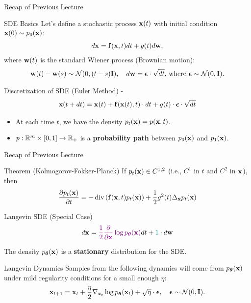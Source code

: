 \documentclass{beamer}
\begin{document}
\begin{frame}{Recap of Previous Lecture}
	\vspace{-0.2cm}
	\begin{block}{SDE Basics}
		Let's define a stochastic process $\mathbf{x}(t)$ with initial condition $\mathbf{x}(0) \sim p_0(\mathbf{x})$:
		\[
			d\mathbf{x} = \mathbf{f}(\mathbf{x}, t) dt + g(t) d \mathbf{w}, 
		\]
		where $\mathbf{w}(t)$ is the standard Wiener process (Brownian motion):
		\vspace{-0.2cm}
		\[		
			\mathbf{w}(t) - \mathbf{w}(s) \sim \mathcal{N}(0, (t - s) \mathbf{I}), \quad d \mathbf{w} = \boldsymbol{\epsilon} \cdot \sqrt{dt}, \, \text{where } \boldsymbol{\epsilon} \sim \mathcal{N}(0, \mathbf{I}).
		\]
	\end{block}
	\vspace{-0.3cm}
	\begin{block}{Discretization of SDE (Euler Method) - \SDESolve}
		\vspace{-0.3cm}
		\[
			\mathbf{x}(t + dt) = \mathbf{x}(t) + \mathbf{f}(\mathbf{x}(t), t) \cdot dt + g(t) \cdot \boldsymbol{\epsilon} \cdot \sqrt{dt}
		\]
		\vspace{-0.3cm}
	\end{block}
	\begin{itemize}
		\item At each time $t$, we have the density $p_t(\mathbf{x}) = p(\mathbf{x}, t)$.
		\item $p: \mathbb{R}^m \times [0, 1] \rightarrow \mathbb{R}_+$ is a \textbf{probability path} between $p_0(\mathbf{x})$ and $p_1(\mathbf{x})$.
	\end{itemize}
\end{frame}
\begin{frame}{Recap of Previous Lecture}
 	\begin{block}{Theorem (Kolmogorov-Fokker-Planck)}
 		If $p_t(\mathbf{x}) \in C^{1,2}$ (i.e., $C^1$ in $t$ and $C^2$ in $\mathbf{x}$), then
 		\vspace{-0.3cm}
 		\[
 			\frac{\partial p_t(\mathbf{x})}{\partial t} = - \operatorname{div}\left(\mathbf{f}(\mathbf{x}, t) p_t(\mathbf{x})\right) + \frac{1}{2}g^2(t) \Delta_{\mathbf{x}}p_t(\mathbf{x})
 		\]
 		\vspace{-0.5cm}
 	\end{block}
 	\begin{block}{Langevin SDE (Special Case)}
 		\vspace{-0.3cm}
 		\[
 			d \mathbf{x} = {\color{violet}\frac{1}{2} \frac{\partial}{\partial \mathbf{x}} \log p_{\boldsymbol{\theta}}(\mathbf{x})} d t + {\color{teal} 1 } \cdot d \mathbf{w}
 		\]
 		\vspace{-0.3cm}
 	\end{block}
 	The density $p_{\boldsymbol{\theta}}(\mathbf{x})$ is a \textbf{stationary} distribution for the SDE.
	\begin{block}{Langevin Dynamics}
		Samples from the following dynamics will come from $p_{\boldsymbol{\theta}}(\mathbf{x})$ under mild regularity conditions for a small enough $\eta$:
		\vspace{-0.2cm}
		\[
			\mathbf{x}_{t + 1} = \mathbf{x}_t + \frac{\eta}{2} \nabla_{\mathbf{x}_t} \log p_{\boldsymbol{\theta}}(\mathbf{x}_t) + \sqrt{\eta} \cdot \boldsymbol{\epsilon}, \quad \boldsymbol{\epsilon} \sim \mathcal{N}(0, \mathbf{I}).
		\]
	\end{block}
\end{frame}
\end{document}
